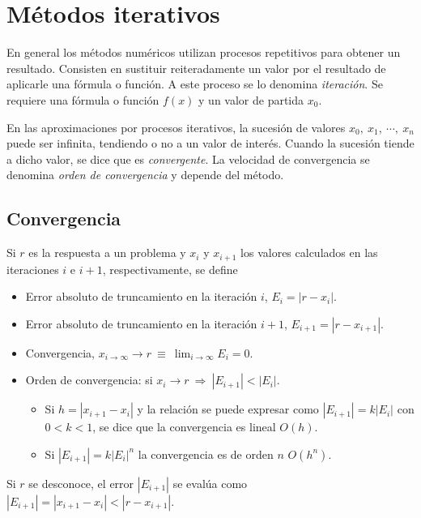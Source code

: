 \documentclass{article}
\begin{document}
\section{Métodos iterativos}

En general los métodos numéricos utilizan procesos repetitivos para obtener un 
resultado. Consisten en sustituir reiteradamente un valor por el resultado 
de aplicarle una fórmula o función. A este proceso se lo denomina 
\textit{iteración}. Se requiere una fórmula o función $f(x)$ y un valor de 
partida $x_0$.

En las aproximaciones por procesos iterativos, la sucesión de valores 
$x_0,\ x_1,\ \cdots,\ x_n$ puede ser infinita, tendiendo o no a un valor de
interés. Cuando la sucesión tiende a dicho valor, se dice que es 
\textit{convergente}. La velocidad de convergencia se denomina 
\textit{orden de convergencia} y depende del método.

\subsection{Convergencia}

Si $r$ es la respuesta a un problema y $x_i$ y $x_{i+1}$ los valores calculados
en las iteraciones $i$ e $i+1$, respectivamente, se define

\begin{itemize}
    \item Error absoluto de truncamiento en la iteración $i$, $E_i = |r-x_i|$.
    \item Error absoluto de truncamiento en la iteración $i+1$, 
        $E_{i+1} = |r-x_{i+1}|$.
    \item Convergencia, $x_{i\to\infty}\to r\ \equiv\ \lim_{i\to\infty}E_i=0$.
    \item Orden de convergencia: si $x_i\to r\ \Rightarrow\ |E_{i+1}|<|E_i|$.
    \begin{itemize}
        \item Si $h = |x_{i+1} - x_{i}|$ y la relación se puede expresar como
            $|E_{i+1}| = k|E_i|$ con $0<k<1$, se dice que la convergencia es
            lineal $O(h)$.
        \item Si $|E_{i+1}| = k|E_i|^n$ la convergencia es de orden $n$ $O(h^n)$.
    \end{itemize}
\end{itemize}

Si $r$ se desconoce, el error $|E_{i+1}|$ se evalúa como 
$|E_{i+1}| = |x_{i+1} - x_i| < |r - x_{i+1}|$.
\end{document}
